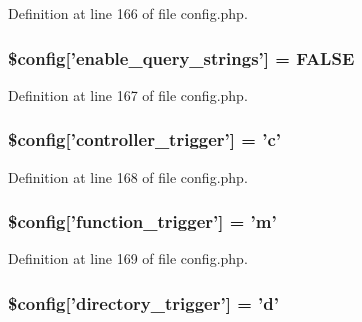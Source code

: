 Definition at line 166 of file config.\-php.

\hypertarget{application_2config_2config_8php_a227b7a6fec0306454ffb0dead1f1c4f7}{
\subsubsection[{\$config}]{\setlength{\rightskip}{0pt plus 5cm}\$config\mbox{[}'enable\-\_\-query\-\_\-strings'\mbox{]} = F\-A\-L\-S\-E}}\label{application_2config_2config_8php_a227b7a6fec0306454ffb0dead1f1c4f7}


Definition at line 167 of file config.\-php.

\hypertarget{application_2config_2config_8php_a7ea9e139536f27af75812de53e852829}{
\subsubsection[{\$config}]{\setlength{\rightskip}{0pt plus 5cm}\$config\mbox{[}'controller\-\_\-trigger'\mbox{]} = '{\bf c}'}}\label{application_2config_2config_8php_a7ea9e139536f27af75812de53e852829}


Definition at line 168 of file config.\-php.

\hypertarget{application_2config_2config_8php_acac6a7410b2ae72152894e3b93501811}{
\subsubsection[{\$config}]{\setlength{\rightskip}{0pt plus 5cm}\$config\mbox{[}'function\-\_\-trigger'\mbox{]} = 'm'}}\label{application_2config_2config_8php_acac6a7410b2ae72152894e3b93501811}


Definition at line 169 of file config.\-php.

\hypertarget{application_2config_2config_8php_af7e6593d4088b77d153dafff4567f143}{
\subsubsection[{\$config}]{\setlength{\rightskip}{0pt plus 5cm}\$config\mbox{[}'directory\-\_\-trigger'\mbox{]} = '{\bf d}'}}\label{application_2config_2config_8php_af7e6593d4088b77d153dafff4567f143}


